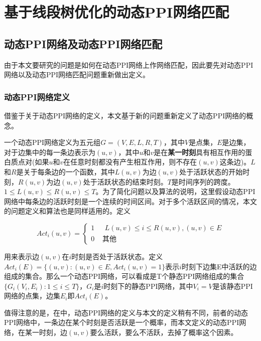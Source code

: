 \renewcommand{\algorithmicrequire}{\textbf{Input:}}
\renewcommand{\algorithmicensure}{\textbf{Output:}}
\chapter{基于线段树优化的动态PPI网络匹配}
\section{动态PPI网络及动态PPI网络匹配}
由于本文要研究的问题是如何在动态PPI网络上作网络匹配，因此要先对动态PPI网络以及动态PPI网络匹配问题重新做出定义。

\subsection{动态PPI网络定义}
借鉴于\cite{zhang2016method}关于动态PPI网络的定义，本文基于新的问题重新定义了动态PPI网络的概念。

一个动态PPI网络定义为五元组$G=(V,E,L,R,T)$，其中$V$是点集，$E$是边集，对于边集中的每一条边表示为$(u,v)$，其中$u$和$v$是在\textbf{某一时刻}具有相互作用的蛋白质点对(如果$u$和$v$在任意时刻都没有产生相互作用，则不存在$(u,v)$这条边)。$L$和$R$是关于每条边的一个函数，其中$L(u,v)$为边$(u,v)$处于活跃状态的开始时刻，$R(u,v)$为边$(u,v)$处于活跃状态的结束时刻。$T$是时间序列的跨度。$1\leq L(u,v)\leq R(u,v)\leq T$。为了简化问题以及算法的说明，这里假设动态PPI网络中每条边的活跃时刻是一个连续的时间区间。对于多个活跃区间的情况，本文的问题定义和算法也是同样适用的。定义

\begin{equation}\label{myworkactivedefine}
Act_i(u,v)=\begin{cases}
1 & \text{  } L(u,v)\leq i\leq R(u,v), (u,v)\in E\\ 
0 & \text{  其他}  
\end{cases}
\end{equation}

用来表示边$(u,v)$在$i$时刻是否处于活跃状态。定义$Act_i(E)=\{(u,v):(u,v)\in E,Act_i(u,v)=1\}$表示$i$时刻下边集E中活跃的边组成的集合。那么一个动态PPI网络，可以看成是T个静态PPI网络组成的集合$\{G_i(V_i,E_i):1\leq i\leq T\}$，$G_i$是$i$时刻下的静态PPI网络，其中$V_i=V$是该静态PPI网络的点集，边集$E_i$即$Act_i(E)$。

值得注意的是，在\cite{zhang2016method}中，动态PPI网络的定义与本文的定义稍有不同，前者的动态PPI网络中，一条边在某个时刻是否活跃是一个概率，而本文定义的动态PPI网络，在某一时刻，边$(u,v)$要么活跃，要么不活跃，去掉了概率这个因素。


